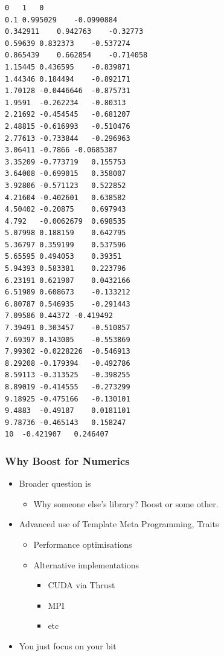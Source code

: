 \begin{verbatim}
0   1   0
0.1 0.995029    -0.0990884
0.342911    0.942763    -0.32773
0.59639 0.832373    -0.537274
0.865439    0.662854    -0.714058
1.15445 0.436595    -0.839871
1.44346 0.184494    -0.892171
1.70128 -0.0446646  -0.875731
1.9591  -0.262234   -0.80313
2.21692 -0.454545   -0.681207
2.48815 -0.616993   -0.510476
2.77613 -0.733844   -0.296963
3.06411 -0.7866 -0.0685387
3.35209 -0.773719   0.155753
3.64008 -0.699015   0.358007
3.92806 -0.571123   0.522852
4.21604 -0.402601   0.638582
4.50402 -0.20875    0.697943
4.792   -0.0062679  0.698535
5.07998 0.188159    0.642795
5.36797 0.359199    0.537596
5.65595 0.494053    0.39351
5.94393 0.583381    0.223796
6.23191 0.621907    0.0432166
6.51989 0.608673    -0.133212
6.80787 0.546935    -0.291443
7.09586 0.44372 -0.419492
7.39491 0.303457    -0.510857
7.69397 0.143005    -0.553869
7.99302 -0.0228226  -0.546913
8.29208 -0.179394   -0.492786
8.59113 -0.313525   -0.398255
8.89019 -0.414555   -0.273299
9.18925 -0.475166   -0.130101
9.4883  -0.49187    0.0181101
9.78736 -0.465143   0.158247
10  -0.421907   0.246407
\end{verbatim}

\subsubsection{Why Boost for Numerics}\label{why-boost-for-numerics}

\begin{itemize}
\itemsep1pt\parskip0pt
\item
  Broader question is

  \begin{itemize}
  \itemsep1pt\parskip0pt
  \item
    Why someone else's library? Boost or some other.
  \end{itemize}
\item
  Advanced use of Template Meta Programming, Traits

  \begin{itemize}
  \itemsep1pt\parskip0pt
  \item
    Performance optimisations
  \item
    Alternative implementations

    \begin{itemize}
    \itemsep1pt\parskip0pt
    \item
      CUDA via Thrust
    \item
      MPI
    \item
      etc
    \end{itemize}
  \end{itemize}
\item
  You just focus on your bit
\end{itemize}

